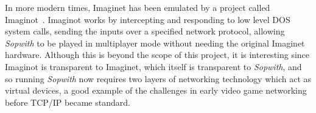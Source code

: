 In more modern times, Imaginet has been emulated by a project called Imaginot~\cite{imaginot}. Imaginot works by intercepting and responding to low level DOS system calls, sending the inputs over a specified network protocol, allowing \textit{Sopwith} to be played in multiplayer mode without needing the original Imaginet hardware. Although this is beyond the scope of this project, it is interesting since Imaginot is transparent to Imaginet, which itself is transparent to \textit{Sopwith}, and so running \textit{Sopwith} now requires two layers of networking technology which act as virtual devices, a good example of the challenges in early video game networking before TCP/IP became standard.
